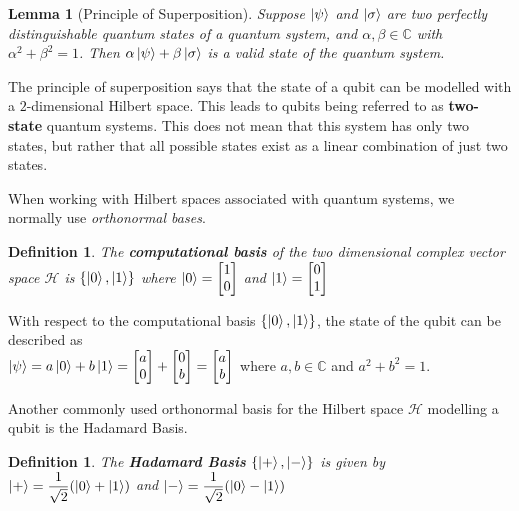 \documentclass[12pt,twoside]{report}
\newtheorem{defn}[subsection]{Definition}
\newtheorem{lemma}[subsection]{Lemma}
\begin{document}
\begin{lemma}[Principle of Superposition]
Suppose $\ket{\psi}$ and $\ket{\sigma}$ are two perfectly distinguishable quantum states of a quantum system, and $\alpha, \beta \in \mathbb{C}$ with $\alpha^2 + \beta ^2 = 1$. Then $\alpha \ket{\psi} + \beta \ket{\sigma}$ is a valid state of the quantum system.
\end{lemma}

The principle of superposition says that the state of a qubit can be modelled with a $2$-dimensional Hilbert space. This leads to qubits being referred to as \textbf{two-state} quantum systems. This does not mean that this system has only two states, but rather that all possible states exist as a linear combination of just two states.

When working with Hilbert spaces associated with quantum systems, we normally use \textit{orthonormal bases}. 
\begin{defn}
The \textbf{computational basis} of the two dimensional complex vector space $\mathcal{H}$ is $\{ \ket{0}, \ket{1} \}$ where $\ket{0} = \begin{bmatrix} 1 \\ 0 \end{bmatrix}$ and $\ket{1} = \begin{bmatrix} 0 \\ 1 \end{bmatrix}$
\end{defn}

With respect to the computational basis $\{ \ket{0}, \ket{1} \}$, the state of the qubit can be described as \\ $\ket{\psi} = a \ket{0} + b \ket{1} = \begin{bmatrix} a \\ 0 \end{bmatrix} + \begin{bmatrix} 0 \\ b \end{bmatrix} = \begin{bmatrix} a \\ b \end{bmatrix} $ where $a, b \in \mathbb{C}$ and $a^2 + b^2 = 1$.

Another commonly used orthonormal basis for the Hilbert space $\mathcal{H}$ modelling a qubit is the Hadamard Basis.
\begin{defn}
The \textbf{Hadamard Basis} $\{ \ket{+}, \ket{-} \}$ is given by \\
$\ket{+} = \displaystyle\frac{1}{\sqrt 2} (\ket{0} + \ket{1})$ and $\ket{-} = \displaystyle\frac{1}{\sqrt 2} (\ket{0} - \ket{1})$
\end{defn}
\end{document}
